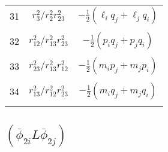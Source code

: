\documentclass[Dissertation.tex]{subfiles}
\begin{document}
\begin{center}
\begin{longtable}{|c|c|c|}
31  & $r_3^2/r_2^2 r_{23}^2$  & $-\frac{1}{2} (\ell_i q_j + \ell_j q_i)$ \\
&  &  \\
32  & $r_{12}^2/r_{13}^2 r_{23}^2$  & $-\frac{1}{2} (p_i q_j + p_j q_i) $ \\
&  &  \\
33  & $r_{23}^2/r_{13}^2 r_{12}^2$  & $-\frac{1}{2} (m_i p_j + m_j p_i)$ \\
&  &  \\
34  & $r_{13}^2/r_{12}^2 r_{23}^2$  & $-\frac{1}{2} (m_i q_j + m_j q_i)$ \\
&  &  \\
\end{longtable}
\end{center}



\subsection[(phi2i L phi2j)]{${(\bar\phi_{2i} L \bar\phi_{2j})}$}
\end{document}
